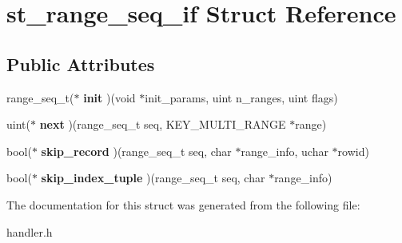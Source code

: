\hypertarget{structst__range__seq__if}{}\section{st\+\_\+range\+\_\+seq\+\_\+if Struct Reference}
\label{structst__range__seq__if}
\subsection*{Public Attributes}
\begin{DoxyCompactItemize}
\item 
\mbox{\label{structst__range__seq__if_abd0debc296bc8b65fd64b06cb91f871b}} 
range\+\_\+seq\+\_\+t($\ast$ {\bfseries init} )(void $\ast$init\+\_\+params, uint n\+\_\+ranges, uint flags)
\item 
\mbox{\label{structst__range__seq__if_a4b8c5a013ed854dc089f02f8b6b07528}} 
uint($\ast$ {\bfseries next} )(range\+\_\+seq\+\_\+t seq, K\+E\+Y\+\_\+\+M\+U\+L\+T\+I\+\_\+\+R\+A\+N\+GE $\ast$range)
\item 
\mbox{\label{structst__range__seq__if_a1d3e4640312bdbf398be7706910c3c59}} 
bool($\ast$ {\bfseries skip\+\_\+record} )(range\+\_\+seq\+\_\+t seq, char $\ast$range\+\_\+info, uchar $\ast$rowid)
\item 
\mbox{\label{structst__range__seq__if_a6e9c99abb9d47dbfbbe90f7d4ec2fdef}} 
bool($\ast$ {\bfseries skip\+\_\+index\+\_\+tuple} )(range\+\_\+seq\+\_\+t seq, char $\ast$range\+\_\+info)
\end{DoxyCompactItemize}


The documentation for this struct was generated from the following file\+:\begin{DoxyCompactItemize}
\item 
handler.\+h\end{DoxyCompactItemize}
